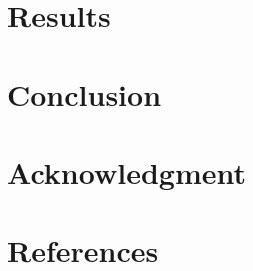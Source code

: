 \documentclass[conference]{IEEEtran}
\begin{document}
\section{Results}
\section{Conclusion}

\section*{Acknowledgment}

\section*{References}
\end{document}
